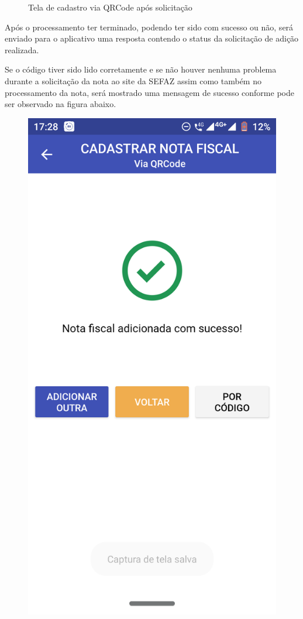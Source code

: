 \begin{figure}[h]
    \caption{Tela de cadastro via QRCode após solicitação}
    \label{appQRCodeSolicitacaoFig}
\end{figure}

\newpage
Após o processamento ter terminado, podendo ter sido com sucesso ou não, será enviado para o aplicativo uma resposta contendo o status da solicitação de adição realizada.

Se o código tiver sido lido corretamente e se não houver nenhuma problema durante a solicitação da nota ao site da SEFAZ assim como também no processamento da nota, será mostrado uma mensagem de sucesso conforme pode ser observado na figura abaixo.

\begin{figure}[h]
    \centering
    \includegraphics[scale=0.15]{tcc/figures/app/app_codigo_qrcode_sucesso.png}

\end{figure}
